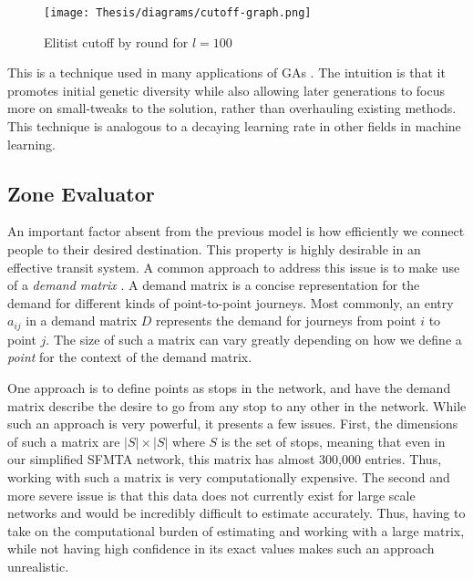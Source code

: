 \documentclass[11pt]{amsart}
\theoremstyle{definition}                  %
\theoremstyle{remark}                       %
\numberwithin{equation}{section}
\begin{document}
\begin{figure}[h]
    \centering
    \texttt{[image: Thesis/diagrams/cutoff-graph.png]}
    \caption{Elitist cutoff by round for $l=100$}
    \label{fig:cutoff_graph}
\end{figure}

This is a technique used in many applications of GAs \cite{holland1992, larranaga1999}. The intuition is that it promotes initial genetic diversity while also allowing later generations to focus more on small-tweaks to the solution, rather than overhauling existing methods. This technique is analogous to a decaying learning rate in other fields in machine learning. 

\subsection{Zone Evaluator} 
An important factor absent from the previous model is how efficiently we connect people to their desired destination. This property is highly desirable in an effective transit system. A common approach to address this issue is to make use of a \textit{demand matrix} \cite{arbex2015, ceder2016, bielli2002}. A demand matrix is a concise representation for the demand for different kinds of point-to-point journeys. Most commonly, an entry $a_{ij}$ in a demand matrix $D$ represents the demand for journeys from point $i$ to point $j$. The size of such a matrix can vary greatly depending on how we define a \textit{point} for the context of the demand matrix. 

One approach is to define points as stops in the network, and have the demand matrix describe the desire to go from any stop to any other in the network. While such an approach is very powerful, it presents a few issues. First, the dimensions of such a matrix are $|S|\times|S|$ where $S$ is the set of stops, meaning that even in our simplified SFMTA network, this matrix has almost 300,000 entries. Thus, working with such a matrix is very computationally expensive. The second and more severe issue is that this data does not currently exist for large scale networks and would be incredibly difficult to estimate accurately. Thus, having to take on the computational burden of estimating and working with a large matrix, while not having high confidence in its exact values makes such an approach unrealistic. 
\end{document}
